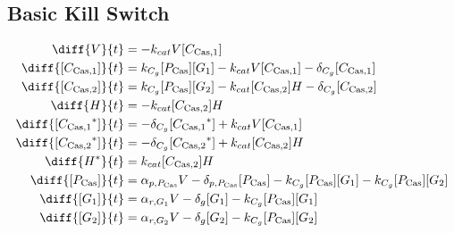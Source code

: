 \subsection{Basic Kill Switch}
\label{s:Basic_kill_switch}

\begin{align}
\diff{\vectorGen{}}{t} & = - \casCutRate{{}}\vectorGen{}\conc{\cplx{\cas}{1}}\\ 
\diff{\conc{\cplx{\cas}{1}}}{t} & =  \gRnaBind{}\conc{\proSp{\cas{}}}\conc{\gRna{1}} - \casCutRate{{}}\vectorGen{}\conc{\cplx{\cas}{1}} - \casCompDegradeRate{}\conc{\cplx{\cas}{1}}\\ 
\diff{\conc{\cplx{\cas}{2}}}{t} & =  \gRnaBind{}\conc{\proSp{\cas{}}}\conc{\gRna{2}} - \casCutRate{{}}\conc{\cplx{\cas}{2}}\hostGen{} - \casCompDegradeRate{}\conc{\cplx{\cas}{2}}\\ 
\diff{\hostGen{}}{t} & = - \casCutRate{{}}\conc{\cplx{\cas}{2}}\hostGen{}\\ 
\diff{\conc{\bound{\cplx{\cas}{1}}}}{t} & = - \casCompDegradeRate{}\conc{\bound{\cplx{\cas}{1}}} + \casCutRate{{}}\vectorGen{}\conc{\cplx{\cas}{1}}\\ 
\diff{\conc{\bound{\cplx{\cas}{2}}}}{t} & = - \casCompDegradeRate{}\conc{\bound{\cplx{\cas}{2}}} + \casCutRate{{}}\conc{\cplx{\cas}{2}}\hostGen{}\\ 
\diff{\edited{\hostGen{}}}{t} & =  \casCutRate{{}}\conc{\cplx{\cas}{2}}\hostGen{}\\ 
\diff{\conc{\proSp{\cas{}}}}{t} & =  \txtlRate{\proSp{\cas{}}}\vectorGen{} - \proDegradeRate{\proSp{\cas{}}}\conc{\proSp{\cas{}}} - \gRnaBind{}\conc{\proSp{\cas{}}}\conc{\gRna{1}} - \gRnaBind{}\conc{\proSp{\cas{}}}\conc{\gRna{2}}\\ 
\diff{\conc{\gRna{1}}}{t} & =  \txRate{\gRna{1}}\vectorGen{} - \rnaDegradeRate{}\conc{\gRna{1}} - \gRnaBind{}\conc{\proSp{\cas{}}}\conc{\gRna{1}}\\ 
\diff{\conc{\gRna{2}}}{t} & =  \txRate{\gRna{2}}\vectorGen{} - \rnaDegradeRate{}\conc{\gRna{2}} - \gRnaBind{}\conc{\proSp{\cas{}}}\conc{\gRna{2}}
\end{align}


